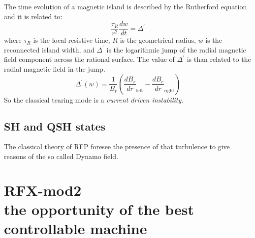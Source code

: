 The time evolution of a magnetic island is described by the Rutherford equation and it is related to:
\begin{equation}
    \frac{\tau_R}{r^2} \frac{dw}{dt} = \Delta^\prime
\end{equation}
%
where $\tau_R$ is the local resistive time, $R$ is the geometrical radius, $w$ is the reconnected island width, and $\Delta^\prime$ is the logarithmic jump of the radial magnetic field component across the rational surface.
%
The value of $\Delta^\prime$ is than related to the radial magnetic field in the jump.
\begin{equation}
    \Delta^\prime (w) = \frac{1}{B_r} \left( \frac{dB_r}{dr}_\text{left} - \frac{dB_r}{dr}_\text{right} \right)
\end{equation}
%	
So the classical tearing mode is a {\em current driven instability}.




    



\subsection{SH and QSH states}

The classical theory of RFP foresee the presence of that turbulence to give reasons of the so called Dynamo field.




\section{RFX-mod2 \\ \small{the opportunity of the best controllable machine}}
\cite{SONATO2003161}
\cite{doi:10.1063/1.4806765}
\cite{martin_RFX_overview}



